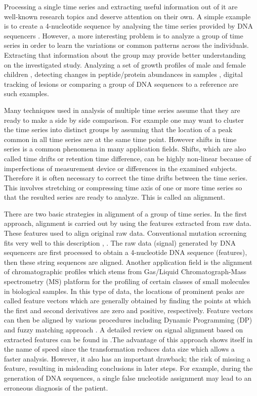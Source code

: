 \documentclass[number,1p,12pt]{elsarticle}
\begin{document}
Processing a single time series and extracting useful information out of it are well-known research topics and deserve  attention on their own. A simple example is to create a 4-nucleotide sequence by analysing the time series provided by DNA sequencers \cite{Ewing1998}. However, a more interesting problem is to analyze a group of time series in order to learn the variations or common patterns across the individuals. Extracting that information about the group may provide better understanding on the investigated study.  Analyzing a set of growth profiles of male and female children \cite{Thalange1996}, detecting changes in peptide/protein abundances in samples \cite{Akella2009}, digital tracking of lesions \cite{Maletti2005} or comparing a group of DNA sequences to a reference \cite{Bonfield1998} are such examples.  

Many techniques used in analysis of multiple time series assume that they are ready to make a side by side comparison. For example one may want to cluster the time series into distinct groups by assuming that the location of a peak common in all time series are at the same time point. However shifts in time series is a common phenomena in many application fields. Shifts, which are also called time drifts or retention time difference, can be highly non-linear because of imperfections of measurement device or differences in the  examined subjects. Therefore it is often necessary to correct the time drifts between the time series. This involves stretching or compressing time axis of one or more time series so that the resulted series are ready to analyze. This is called an alignment.

There are two basic strategies in alignment of a group of time series. In the first approach, alignment is carried out by using the features extracted from raw data. These features used to align original raw data. Conventional mutation screening fits very well to this description \cite{Mott1998}, \cite{Nickerson1997}. The raw data (signal) generated by DNA sequencers are first processed to obtain a 4-nucleotide DNA sequence (features), then these  string sequences are aligned. Another application field is the alignment of chromatographic profiles which stems from Gas/Liquid Chromatograph-Mass spectrometry (MS) platform for the profiling of certain classes of small molecules in biological samples. In this type of data, the locations of prominent peaks are called feature vectors which are generally obtained by finding the points at which the first and second derivatives are zero and positive, respectively. Feature vectors can then be aligned by various procedures including Dynamic Programming (DP) \cite{Robinson2007} and fuzzy matching approach \cite{Walczak2005}. A detailed review on signal alignment based on extracted features can be found in \cite{Aberg2009}.The advantage of this approach shows itself in the name of speed since the transformation reduces data size which allows a faster analysis. However, it also has an important drawback; the risk of missing a feature, resulting in misleading conclusions in later steps. For example, during the generation of DNA sequences, a single false nucleotide assignment may lead to an erroneous diagnosis of the patient. 
\end{document}
